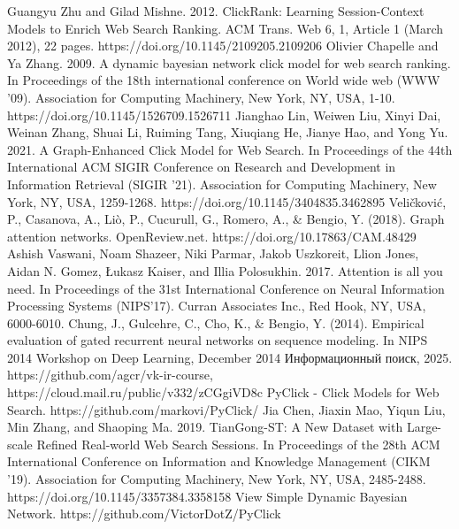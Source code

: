 \documentclass[diploma]{nanolab2015}
\begin{document}
\begin{thebibliography}{00}
    Guangyu Zhu and Gilad Mishne. 2012. ClickRank: Learning Session-Context Models to Enrich Web Search Ranking. ACM Trans. Web 6, 1, Article 1 (March 2012), 22 pages. https://doi.org/10.1145/2109205.2109206
    Olivier Chapelle and Ya Zhang. 2009. A dynamic bayesian network click model for web search ranking. In Proceedings of the 18th international conference on World wide web (WWW '09). Association for Computing Machinery, New York, NY, USA, 1-10. https://doi.org/10.1145/1526709.1526711
    Jianghao Lin, Weiwen Liu, Xinyi Dai, Weinan Zhang, Shuai Li, Ruiming Tang, Xiuqiang He, Jianye Hao, and Yong Yu. 2021. A Graph-Enhanced Click Model for Web Search. In Proceedings of the 44th International ACM SIGIR Conference on Research and Development in Information Retrieval (SIGIR '21). Association for Computing Machinery, New York, NY, USA, 1259-1268. https://doi.org/10.1145/3404835.3462895
    Veličković, P., Casanova, A., Liò, P., Cucurull, G., Romero, A., \& Bengio, Y. (2018). Graph attention networks. OpenReview.net. https://doi.org/10.17863/CAM.48429
    Ashish Vaswani, Noam Shazeer, Niki Parmar, Jakob Uszkoreit, Llion Jones, Aidan N. Gomez, Łukasz Kaiser, and Illia Polosukhin. 2017. Attention is all you need. In Proceedings of the 31st International Conference on Neural Information Processing Systems (NIPS'17). Curran Associates Inc., Red Hook, NY, USA, 6000-6010.
    Chung, J., Gulcehre, C., Cho, K., \& Bengio, Y. (2014). Empirical evaluation of gated recurrent neural networks on sequence modeling. In NIPS 2014 Workshop on Deep Learning, December 2014
    Информационный поиск, 2025. https://github.com/agcr/vk-ir-course, https://cloud.mail.ru/public/v332/zCGgiVD8c
    PyClick - Click Models for Web Search. https://github.com/markovi/PyClick/
    Jia Chen, Jiaxin Mao, Yiqun Liu, Min Zhang, and Shaoping Ma. 2019. TianGong-ST: A New Dataset with Large-scale Refined Real-world Web Search Sessions. In Proceedings of the 28th ACM International Conference on Information and Knowledge Management (CIKM '19). Association for Computing Machinery, New York, NY, USA, 2485-2488. https://doi.org/10.1145/3357384.3358158
    View Simple Dynamic Bayesian Network. https://github.com/VictorDotZ/PyClick
\end{thebibliography}
\end{document}
